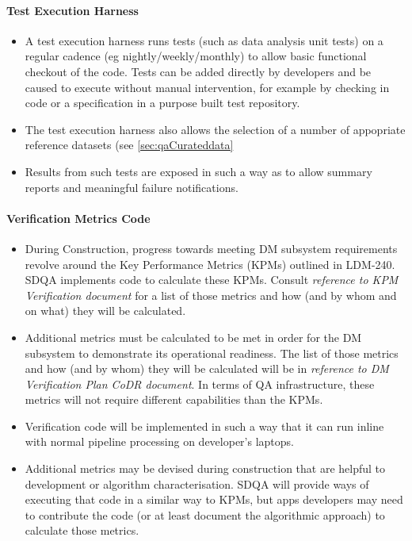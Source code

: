 \paragraph{Test Execution Harness}
\label{sec:qaTestharness}
\begin{itemize}

\item A test execution harness runs tests (such as data analysis unit tests) on a regular cadence (eg nightly/weekly/monthly) to allow basic functional checkout of the code. Tests can be added directly by developers and be caused to execute without manual intervention, for example by checking in code or a specification in a purpose built test repository.

\item The test execution harness also allows the selection of a number of appopriate reference datasets (see \ref{sec:qaCurateddata}

\item Results from such tests are exposed in such a way as to allow summary reports and meaningful failure notifications.

\end{itemize}

\paragraph{Verification Metrics Code}
\label{sec:qaVerify}
\begin{itemize}

\item During Construction, progress towards meeting DM subsystem requirements revolve around the Key Performance Metrics (KPMs) outlined in LDM-240. SDQA implements code to calculate these KPMs. Consult \emph{ reference to KPM Verification document} for a list of those metrics and how (and by whom and on what) they will be calculated.

\item Additional metrics must be calculated to be met in order for the DM subsystem to demonstrate its operational readiness. The list of those metrics and how (and by whom) they will be calculated will be in \emph{reference to DM Verification Plan CoDR document}. In terms of QA infrastructure, these metrics will not require different capabilities than the KPMs.

\item Verification code will be implemented in such a way that it can run inline with normal pipeline processing on developer's laptops.

\item Additional metrics may be devised during construction that are helpful to development or algorithm characterisation. SDQA will provide ways of executing that code in a similar way to KPMs, but apps developers may need to contribute the code (or at least document the algorithmic approach) to calculate those metrics.

\end{itemize}

